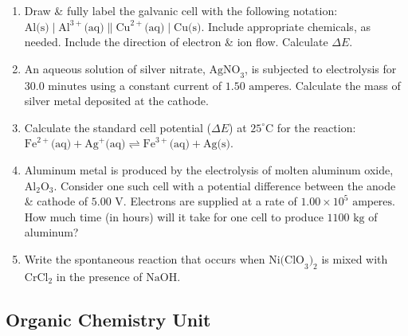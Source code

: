 \documentclass[12pt]{article}
\begin{document}
\begin{enumerate}[label=\arabic*.]
    \item Draw \& fully label the galvanic cell with the following notation: $\text{Al(s)} \mid \text{Al}^{3+}\text{(aq)} \parallel \text{Cu}^{2+}\text{(aq)} \mid \text{Cu(s)}$. Include appropriate chemicals, as needed. Include the direction of electron \& ion flow. Calculate $\Delta E$.
    \vspace{5cm}

    \item An aqueous solution of silver nitrate, $\text{AgNO}_3$, is subjected to electrolysis for $30.0\text{ minutes}$ using a constant current of $1.50\text{ amperes}$. Calculate the mass of silver metal deposited at the cathode.
    \vspace{3.5cm}

    \item Calculate the standard cell potential ($\Delta E$) at $25^\circ\text{C}$ for the reaction: $\text{Fe}^{2+}\text{(aq)} + \text{Ag}^+\text{(aq)} \rightleftharpoons \text{Fe}^{3+}\text{(aq)} + \text{Ag(s)}$.
    \vspace{3.5cm}

    \item Aluminum metal is produced by the electrolysis of molten aluminum oxide, $\text{Al}_2\text{O}_3$. Consider one such cell with a potential difference between the anode \& cathode of $5.00\text{ V}$. Electrons are supplied at a rate of $1.00 \times 10^5\text{ amperes}$. How much time (in hours) will it take for one cell to produce $1100\text{ kg}$ of aluminum?
    \vspace{4.5cm}

    \item Write the spontaneous reaction that occurs when $\text{Ni(ClO}_3)_2$ is mixed with $\text{CrCl}_2$ in the presence of $\text{NaOH}$.
    \vspace{3.5cm}
\end{enumerate}

\newpage

\subsection*{Organic Chemistry Unit}
\end{document}
